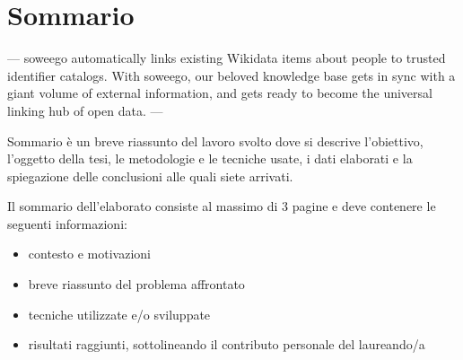 \chapter*{Sommario} %
\label{abstract}


--- soweego automatically links existing Wikidata items about people to trusted identifier catalogs.
With soweego, our beloved knowledge base gets in sync with a giant volume of external information, and gets ready to become the universal linking hub of open data. ---


  Sommario è un breve riassunto del lavoro svolto dove si descrive l'obiettivo, l'oggetto della tesi, le 
metodologie e le tecniche usate, i dati elaborati e la spiegazione delle conclusioni alle quali siete arrivati.  

Il sommario dell’elaborato consiste al massimo di 3 pagine e deve contenere le seguenti informazioni:
\begin{itemize}
  \item contesto e motivazioni 
  \item breve riassunto del problema affrontato
  \item tecniche utilizzate e/o sviluppate
  \item risultati raggiunti, sottolineando il contributo personale del laureando/a
\end{itemize}




